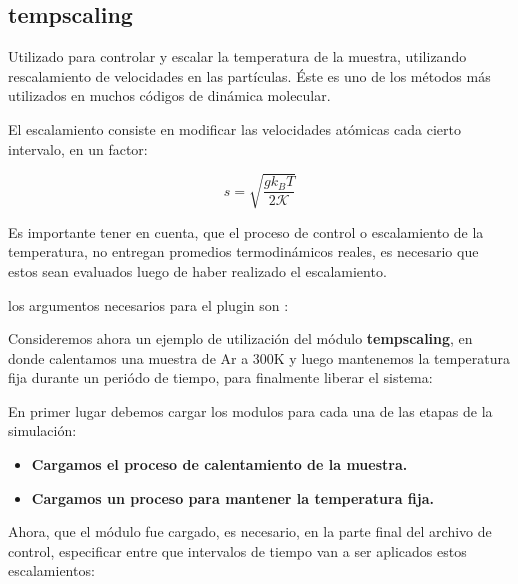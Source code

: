 \subsection{tempscaling}

Utilizado para controlar y escalar la temperatura de la muestra, utilizando
rescalamiento de velocidades en las part\'iculas. \'Este es uno de los m\'etodos
m\'as utilizados en muchos c\'odigos de din\'amica molecular.

El escalamiento consiste en modificar las velocidades at\'omicas cada cierto
intervalo, en un factor:

$$s=\sqrt{\frac{gk_BT}{2\mathcal{K}}}$$

Es importante tener en cuenta, que el proceso de control o escalamiento de la
temperatura, no entregan promedios termodin\'amicos reales, es necesario que
estos sean evaluados luego de haber realizado el escalamiento.

los argumentos necesarios para el plugin son :


Consideremos ahora un ejemplo de utilizaci\'on del m\'odulo
\textbf{tempscaling}, en donde calentamos una muestra de Ar a 300K y luego
mantenemos la temperatura fija durante un peri\'odo de tiempo, para finalmente
liberar el sistema:

En primer lugar debemos cargar los modulos para cada una de las etapas de la
simulaci\'on:

\begin{itemize}
 \item \textbf{Cargamos el proceso de calentamiento de la muestra.}
 \item \textbf{Cargamos un proceso para mantener la temperatura fija.}
\end{itemize}

Ahora, que el m\'odulo fue cargado, es necesario, en la parte final del archivo
de control, especificar entre que intervalos de tiempo van a ser aplicados estos
escalamientos:

